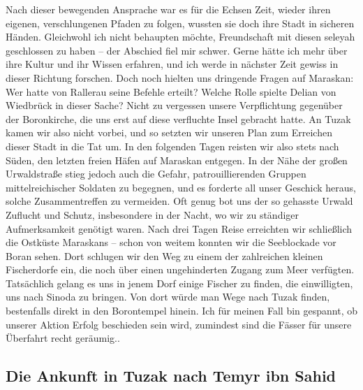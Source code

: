 Nach dieser bewegenden Ansprache war es für die Echsen Zeit, wieder ihren eigenen, verschlungenen Pfaden zu folgen, wussten sie doch ihre Stadt in sicheren Händen. Gleichwohl ich nicht behaupten möchte, Freundschaft mit diesen seleyah geschlossen zu haben -- der Abschied fiel mir schwer. Gerne hätte ich mehr über ihre Kultur und ihr Wissen erfahren, und ich werde in nächster Zeit gewiss in dieser Richtung forschen. Doch noch hielten uns dringende Fragen auf Maraskan: Wer hatte von Rallerau seine Befehle erteilt? Welche Rolle spielte Delian von Wiedbrück in dieser Sache? Nicht zu vergessen unsere Verpflichtung gegenüber der Boronkirche, die uns erst auf diese verfluchte Insel gebracht hatte. An Tuzak kamen wir also nicht vorbei, und so setzten wir unseren Plan zum Erreichen dieser Stadt in die Tat um. In den folgenden Tagen reisten wir also stets nach Süden, den letzten freien Häfen auf Maraskan entgegen. In der Nähe der großen Urwaldstraße stieg jedoch auch die Gefahr, patrouillierenden Gruppen mittelreichischer Soldaten zu begegnen, und es forderte all unser Geschick heraus, solche Zusammentreffen zu vermeiden. Oft genug bot uns der so gehasste Urwald Zuflucht und Schutz, insbesondere in der Nacht, wo wir zu ständiger Aufmerksamkeit genötigt waren. Nach drei Tagen Reise erreichten wir schließlich die Ostküste Maraskans -- schon von weitem konnten wir die Seeblockade vor Boran sehen. Dort schlugen wir den Weg zu einem der zahlreichen kleinen Fischerdorfe ein, die noch über einen ungehinderten Zugang zum Meer verfügten. Tatsächlich gelang es uns in jenem Dorf einige Fischer zu finden, die einwilligten, uns nach Sinoda zu bringen. Von dort würde man Wege nach Tuzak finden, bestenfalls direkt in den Borontempel hinein. Ich für meinen Fall bin gespannt, ob unserer Aktion Erfolg beschieden sein wird, zumindest sind die Fässer für unsere Überfahrt recht geräumig..

\subsection{Die Ankunft in Tuzak nach Temyr ibn Sahid}


